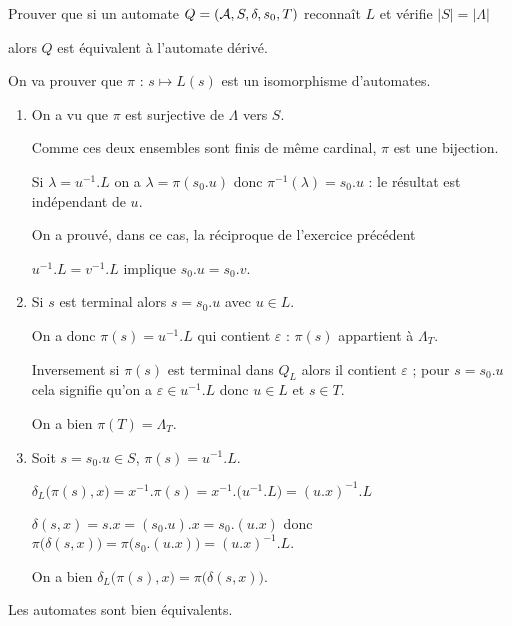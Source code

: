 \begin{Exercise}[title = Unicité]

Prouver que si un automate $Q=({\cal A},S,\delta,s_0,T)$ reconnaît $L$ et vérifie $|S|=|\Lambda|$ 

alors $Q$ est équivalent à l'automate dérivé.
\end{Exercise}
\begin{Answer}
On va prouver que $\pi$ : $s \mapsto L(s)$ est un isomorphisme d'automates.
\begin{enumerate}
\item On a vu que $\pi$ est surjective de $\Lambda$ vers $S$. 

Comme ces deux ensembles sont finis de même cardinal, $\pi$ est une bijection.

Si $\lambda = u^{-1}.L$ on a $\lambda = \pi(s_0.u)$ donc $\pi^{-1}(\lambda)=s_0.u$ : le résultat est indépendant de $u$.

On a prouvé, dans ce cas, la réciproque de l'exercice précédent 

$u^{-1}.L = v^{-1}.L$ implique $s_0.u=s_0.v$.
\item Si $s$ est terminal alors $s=s_0.u$ avec $u\in L$. 

On a donc $\pi(s)=u^{-1}.L$ qui contient $\varepsilon$ : $\pi(s)$ appartient à $\Lambda_T$.

Inversement si $\pi(s)$ est terminal dans $Q_L$ alors il contient $\varepsilon$ ; pour $s=s_0.u$ cela signifie qu'on a $\varepsilon \in u^{-1}.L$ donc $u\in L$ et $s\in T$.

On a bien $\pi(T)=\Lambda_T$.
\item Soit $s = s_0.u\in S$, $\pi(s)=u^{-1}.L$.

$\delta_L\bigl(\pi(s), x\bigr)=x^{-1}.\pi(s)=x^{-1}.\bigl(u^{-1}.L\bigr) = (u.x)^{-1}.L$

$\delta(s,x)= s.x=(s_0.u).x=s_0.(u.x)$ donc $\pi\bigl(\delta(s,x)\bigr) =\pi\bigl(s_0.(u.x)\bigr)
=(u.x)^{-1}.L$.

On a bien $\delta_L\bigl(\pi(s), x\bigr)=\pi\bigl(\delta(s,x)\bigr)$.
\end{enumerate}
Les automates sont bien équivalents.
\end{Answer}


